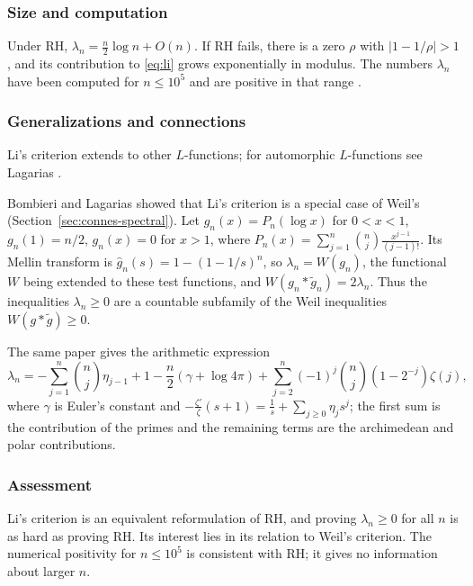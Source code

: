 \documentclass[11pt]{amsart}
\theoremstyle{definition}
\theoremstyle{remark}
\begin{document}
\subsubsection{Size and computation}

Under RH, $\lambda_n=\tfrac n2\log n+O(n)$. If RH fails, there is a zero $\rho$ with $|1-1/\rho|>1$, and its contribution to \eqref{eq:li} grows exponentially in modulus. The numbers $\lambda_n$ have been computed for $n\le 10^5$ and are positive in that range \cite{johansson2015}.

\subsubsection{Generalizations and connections}

Li's criterion extends to other $L$-functions; for automorphic $L$-functions see Lagarias \cite{lagarias2007}.

Bombieri and Lagarias \cite{bombieri1999} showed that Li's criterion is a special case of Weil's (Section~\ref{sec:connes-spectral}). Let $g_n(x)=P_n(\log x)$ for $0<x<1$, $g_n(1)=n/2$, $g_n(x)=0$ for $x>1$, where $P_n(x)=\sum_{j=1}^{n}\binom nj\frac{x^{j-1}}{(j-1)!}$. Its Mellin transform is $\widehat g_n(s)=1-(1-1/s)^n$, so $\lambda_n=W(g_n)$, the functional $W$ being extended to these test functions, and $W(g_n*\tilde g_n)=2\lambda_n$. Thus the inequalities $\lambda_n\ge0$ are a countable subfamily of the Weil inequalities $W(g*\tilde g)\ge 0$.

The same paper gives the arithmetic expression
\[
\lambda_n=-\sum_{j=1}^{n}\binom nj\eta_{j-1}+1-\frac n2(\gamma+\log4\pi)+\sum_{j=2}^{n}(-1)^j\binom nj(1-2^{-j})\zeta(j),
\]
where $\gamma$ is Euler's constant and $-\frac{\zeta'}{\zeta}(s+1)=\frac1s+\sum_{j\ge0}\eta_js^j$; the first sum is the contribution of the primes and the remaining terms are the archimedean and polar contributions.

\subsubsection{Assessment}

Li's criterion is an equivalent reformulation of RH, and proving $\lambda_n \ge 0$ for all $n$ is as hard as proving RH. Its interest lies in its relation to Weil's criterion. The numerical positivity for $n \le 10^5$ is consistent with RH; it gives no information about larger $n$.

\end{document}
